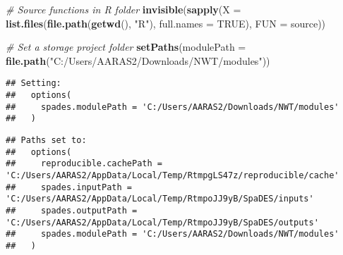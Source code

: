 \documentclass[]{article}
\newenvironment{Shaded}{\begin{snugshade}}{\end{snugshade}}
\newcommand{\KeywordTok}[1]{\textcolor[rgb]{0.13,0.29,0.53}{\textbf{#1}}}
\newcommand{\DataTypeTok}[1]{\textcolor[rgb]{0.13,0.29,0.53}{#1}}
\newcommand{\StringTok}[1]{\textcolor[rgb]{0.31,0.60,0.02}{#1}}
\newcommand{\CommentTok}[1]{\textcolor[rgb]{0.56,0.35,0.01}{\textit{#1}}}
\newcommand{\OtherTok}[1]{\textcolor[rgb]{0.56,0.35,0.01}{#1}}
\newcommand{\NormalTok}[1]{#1}
\begin{document}
\begin{Shaded}
\begin{Highlighting}[]
\CommentTok{# Source functions in R folder}
\KeywordTok{invisible}\NormalTok{(}\KeywordTok{sapply}\NormalTok{(}\DataTypeTok{X =} \KeywordTok{list.files}\NormalTok{(}\KeywordTok{file.path}\NormalTok{(}\KeywordTok{getwd}\NormalTok{(), }\StringTok{"R"}\NormalTok{), }\DataTypeTok{full.names =} \OtherTok{TRUE}\NormalTok{), }\DataTypeTok{FUN =}\NormalTok{ source))}

\CommentTok{# Set a storage project folder}
\KeywordTok{setPaths}\NormalTok{(}\DataTypeTok{modulePath =} \KeywordTok{file.path}\NormalTok{(}\StringTok{"C:/Users/AARAS2/Downloads/NWT/modules"}\NormalTok{))}
\end{Highlighting}
\end{Shaded}

\begin{verbatim}
## Setting:
##   options(
##     spades.modulePath = 'C:/Users/AARAS2/Downloads/NWT/modules'
##   )
\end{verbatim}

\begin{verbatim}
## Paths set to:
##   options(
##     reproducible.cachePath = 'C:/Users/AARAS2/AppData/Local/Temp/RtmpgLS47z/reproducible/cache'
##     spades.inputPath = 'C:/Users/AARAS2/AppData/Local/Temp/RtmpoJJ9yB/SpaDES/inputs'
##     spades.outputPath = 'C:/Users/AARAS2/AppData/Local/Temp/RtmpoJJ9yB/SpaDES/outputs'
##     spades.modulePath = 'C:/Users/AARAS2/Downloads/NWT/modules'
##   )
\end{verbatim}
\end{document}

